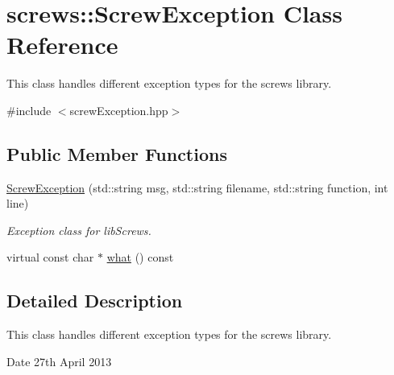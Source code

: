 \hypertarget{classscrews_1_1_screw_exception}{\section{screws\+:\+:Screw\+Exception Class Reference}
\label{classscrews_1_1_screw_exception}
}


This class handles different exception types for the screws library.  




{\ttfamily \#include $<$screw\+Exception.\+hpp$>$}

\subsection*{Public Member Functions}
\begin{DoxyCompactItemize}
\item 
\hyperlink{classscrews_1_1_screw_exception_a615410830d2284cbbf84136ad6533948}{Screw\+Exception} (std\+::string msg, std\+::string filename, std\+::string function, int line)
\begin{DoxyCompactList}\small\item\em Exception class for lib\+Screws. \end{DoxyCompactList}\item 
virtual const char $\ast$ \hyperlink{classscrews_1_1_screw_exception_aeec805cf5c60eb5270c7f47d28e32319}{what} () const 
\end{DoxyCompactItemize}


\subsection{Detailed Description}
This class handles different exception types for the screws library. 

\begin{DoxyDate}{Date}
27th April 2013 
\end{DoxyDate}


